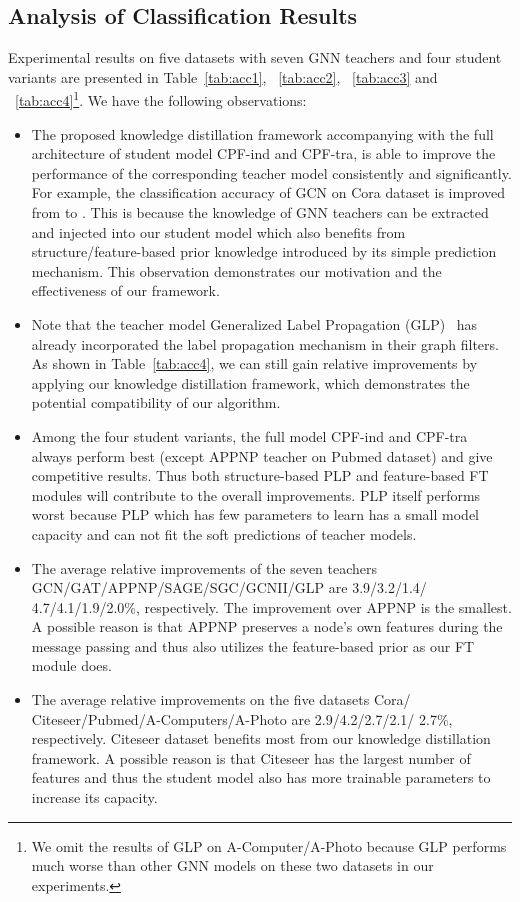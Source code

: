 \documentclass[sigconf]{acmart}
\begin{document}
\subsection{Analysis of Classification Results}
Experimental results on five datasets with seven GNN teachers and four student variants are presented in Table~\ref{tab:acc1}, ~\ref{tab:acc2}, ~\ref{tab:acc3} and ~\ref{tab:acc4}\footnote{We omit the results of GLP on A-Computer/A-Photo because GLP performs much worse than other GNN models on these two datasets in our experiments.}. We have the following observations:
\begin{itemize}
    \item The proposed knowledge distillation framework accompanying with the full architecture of student model CPF-ind and CPF-tra, is able to improve the performance of the corresponding teacher model consistently and significantly. For example, the classification accuracy of GCN on Cora dataset is improved from  to . This is because the knowledge of GNN teachers can be extracted and injected into our student model which also benefits from structure/feature-based prior knowledge introduced by its simple prediction mechanism. This observation demonstrates our motivation and the effectiveness of our framework.
    \item Note that the teacher model Generalized Label Propagation (GLP)~\cite{li2019label} has already incorporated the label propagation mechanism in their graph filters. As shown in Table~\ref{tab:acc4}, we can still gain  relative improvements by applying our knowledge distillation framework, which demonstrates the potential compatibility of our algorithm. 
    \item Among the four student variants, the full model CPF-ind and CPF-tra always perform best (except APPNP teacher on Pubmed dataset) and give competitive results. Thus both structure-based PLP and feature-based FT modules will contribute to the overall improvements. PLP itself performs worst because PLP which has few parameters to learn has a small model capacity and can not fit the soft predictions of teacher models.
    \item The average relative improvements of the seven teachers\\ GCN/GAT/APPNP/SAGE/SGC/GCNII/GLP are 3.9/3.2/1.4/
    4.7/4.1/1.9/2.0\%, respectively. The improvement over APPNP is the smallest. A possible reason is that APPNP preserves a node's own features during the message passing and thus also utilizes the feature-based prior as our FT module does.
    \item The average relative improvements on the five datasets Cora/\\
    Citeseer/Pubmed/A-Computers/A-Photo are 2.9/4.2/2.7/2.1/ 2.7\%, respectively. Citeseer dataset benefits most from our knowledge distillation framework. A possible reason is that Citeseer has the largest number of features and thus the student model also has more trainable parameters to increase its capacity.
\end{itemize}
\end{document}
